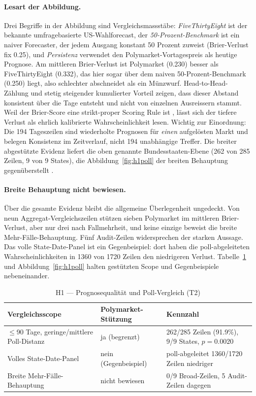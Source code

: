 \paragraph{Lesart der Abbildung.}
Drei Begriffe in der Abbildung sind Vergleichsmassstäbe: \emph{FiveThirtyEight} ist der bekannte umfragebasierte US-Wahlforecast, der \emph{50-Prozent-Benchmark} ist ein naiver Forecaster, der jedem Ausgang konstant 50 Prozent zuweist (Brier-Verlust fix 0.25), und \emph{Persistenz} verwendet den Polymarket-Vortagespreis als heutige Prognose. Am mittleren Brier-Verlust ist Polymarket (0.230) besser als FiveThirtyEight (0.332), das hier sogar über dem naiven 50-Prozent-Benchmark (0.250) liegt, also schlechter abschneidet als ein Münzwurf. Head-to-Head-Zählung und stetig steigender kumulierter Vorteil zeigen, dass dieser Abstand konsistent über die Tage entsteht und nicht von einzelnen Ausreissern stammt. Weil der Brier-Score eine strikt-proper Scoring Rule ist \citep{lit_gneiting_2007}, lässt sich der tiefere Verlust als ehrlich kalibrierte Wahrscheinlichkeit lesen. Wichtig zur Einordnung: Die 194 Tageszeilen sind wiederholte Prognosen für \emph{einen} aufgelösten Markt und belegen Konsistenz im Zeitverlauf, nicht 194 unabhängige Treffer. Die breiter abgestützte Evidenz liefert die oben genannte Bundesstaaten-Ebene (262 von 285 Zeilen, 9 von 9 States), die Abbildung~\ref{fig:h1poll} der breiten Behauptung gegenüberstellt \citep{lit_berg_2008}.

\paragraph{Breite Behauptung nicht bewiesen.}
Über die gesamte Evidenz bleibt die allgemeine Überlegenheit ungedeckt. Von
neun Aggregat-Vergleichszeilen stützen sieben Polymarket im mittleren
Brier-Verlust, aber nur drei nach Fallmehrheit, und keine einzige beweist die
breite Mehr-Fälle-Behauptung. Fünf Audit-Zeilen widersprechen der starken
Aussage. Das volle State-Date-Panel ist ein Gegenbeispiel: dort haben die
poll-abgeleiteten Wahrscheinlichkeiten in 1360 von 1720 Zeilen den niedrigeren
Verlust. Tabelle~\ref{tab:t2} und Abbildung~\ref{fig:h1poll} halten gestützten
Scope und Gegenbeispiele nebeneinander.

\begin{table}[ht]
\centering
\caption{H1 --- Prognosequalität und Poll-Vergleich (T2)}
\label{tab:t2}
\small
\begin{tabular}{@{}lll@{}}
\toprule
Vergleichsscope & Polymarket-Stützung & Kennzahl \\
\midrule
$\leq$90 Tage, geringe/mittlere Poll-Distanz & ja (begrenzt) & 262/285 Zeilen (91.9\%), 9/9 States, $p=0.0020$ \\
Volles State-Date-Panel & nein (Gegenbeispiel) & poll-abgeleitet 1360/1720 Zeilen niedriger \\
Breite Mehr-Fälle-Behauptung & nicht bewiesen & 0/9 Broad-Zeilen, 5 Audit-Zeilen dagegen \\
\bottomrule
\end{tabular}
\end{table}

